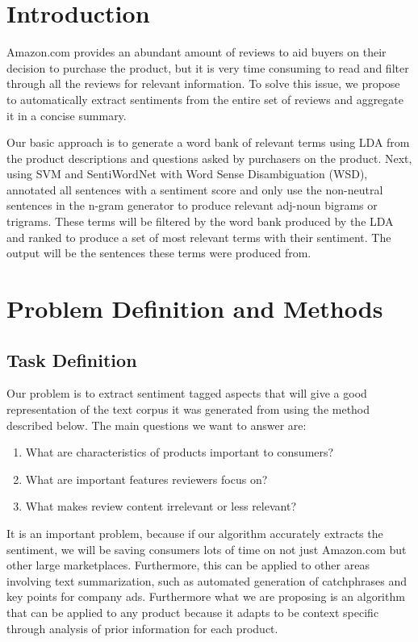 \documentclass{article}
\begin{document}
 


\section{Introduction}
Amazon.com provides an abundant amount of reviews to aid buyers on their decision to purchase the product, but it is very time consuming to read and filter through all the reviews for relevant information.
To solve this issue, we propose to automatically extract sentiments from the entire set of reviews and aggregate it in a concise summary.

Our basic approach is to generate a word bank of relevant terms using LDA from the product descriptions and questions asked by purchasers on the product. Next, using SVM and SentiWordNet with Word Sense Disambiguation (WSD), annotated all sentences with a sentiment score and only use the non-neutral sentences in the n-gram generator to produce relevant adj-noun bigrams or trigrams. These terms will be filtered by the word bank produced by the LDA and ranked to produce a set of most relevant terms with their sentiment. The output will be the sentences these terms were produced from.  

\section{Problem Definition and Methods} 
 \subsection{Task Definition}
Our problem is to extract sentiment tagged aspects that will give a good representation of the text corpus it was generated from using the method described below. The main questions we want to answer are:
\begin{enumerate}
\item What are characteristics of products important to consumers?
\item What are important features reviewers focus on?
\item What makes review content irrelevant or less relevant?
\end{enumerate}

It is an important problem, because if our algorithm accurately extracts the sentiment, we will be saving consumers lots of time on not just Amazon.com but other large marketplaces. Furthermore, this can be applied to other areas involving text summarization, such as automated generation of catchphrases and key points for company ads. Furthermore what we are proposing is an algorithm that can be applied to any product because it adapts to be context specific through analysis of prior information for each product. 
\end{document}

